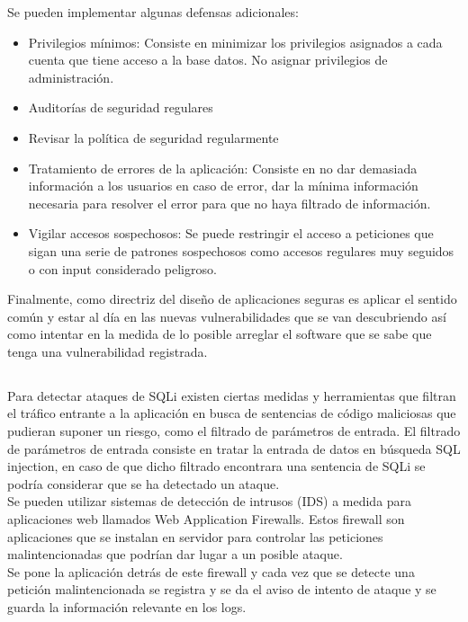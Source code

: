 \documentclass[a4paper,oneside]{article}
\begin{document}
Se pueden implementar algunas defensas adicionales:

\begin{itemize}
\item Privilegios mínimos: Consiste en minimizar los privilegios asignados a cada cuenta que tiene acceso a la base datos. No asignar privilegios de administración.
\item Auditorías de seguridad regulares
\item Revisar la política de seguridad regularmente
\item Tratamiento de errores de la aplicación: Consiste en no dar demasiada información a los usuarios en caso de error, dar la mínima información necesaria para resolver el error para que no haya filtrado de información.
\item Vigilar accesos sospechosos: Se puede restringir el acceso a peticiones que sigan una serie de patrones sospechosos como accesos regulares muy seguidos o con input considerado peligroso.
\end{itemize}

Finalmente, como directriz del diseño de aplicaciones seguras es aplicar el sentido común y estar al día en las nuevas vulnerabilidades que se van descubriendo así como intentar en la medida de lo posible arreglar el software que se sabe que tenga una vulnerabilidad registrada.

\subsection{}
Para detectar ataques de SQLi existen ciertas medidas y herramientas que filtran el tráfico entrante a la aplicación en busca de sentencias de código maliciosas que pudieran suponer un riesgo, como el filtrado de parámetros de entrada.
El filtrado de parámetros de entrada consiste en tratar la entrada de datos en búsqueda SQL injection, en caso de que dicho filtrado encontrara una sentencia de SQLi se podría considerar que se ha detectado un ataque.\\

Se pueden utilizar sistemas de detección de intrusos (IDS) a medida para aplicaciones web llamados Web Application Firewalls. Estos firewall son aplicaciones que se instalan en servidor para controlar las peticiones malintencionadas que podrían dar lugar a un posible ataque.\\

Se pone la aplicación detrás de este firewall y cada vez que se detecte una petición malintencionada se registra y se da el aviso de intento de ataque y se guarda la información relevante en los logs.
\end{document}

